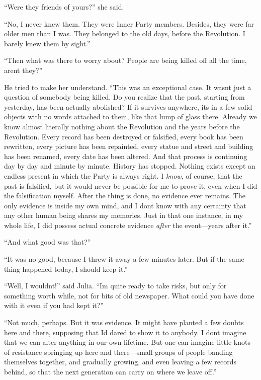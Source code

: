 ``Were they friends of yours?'' she said.

``No, I never knew them. They were Inner Party members. Besides, they
were far older men than I was. They belonged to the old days, before the
Revolution. I barely knew them by sight.''

``Then what was there to worry about? People are being killed off all the
time, aren\textquotesingle t they?''

He tried to make her understand. ``This was an exceptional case. It
wasn\textquotesingle t just a question of somebody being killed. Do you
realize that the past, starting from yesterday, has been actually
abolished? If it survives anywhere, it\textquotesingle s in a few solid
objects with no words attached to them, like that lump of glass there.
Already we know almost literally nothing about the Revolution and the
years before the Revolution. Every record has been destroyed or
falsified, every book has been rewritten, every picture has been
repainted, every statue and street and building has been renamed, every
date has been altered. And that process is continuing day by day and
minute by minute. History has stopped. Nothing exists except an endless
present in which the Party is always right. I \emph{know}, of course,
that the past is falsified, but it would never be possible for me to
prove it, even when I did the falsification myself. After the thing is
done, no evidence ever remains. The only evidence is inside my own mind,
and I don\textquotesingle t know with any certainty that any other human
being shares my memories. Just in that one instance, in my whole life, I
did possess actual concrete evidence \emph{after} the event---years
after it.''

``And what good was that?''

``It was no good, because I threw it away a few minutes later. But if the
same thing happened today, I should keep it.''

``Well, I wouldn\textquotesingle t!'' said Julia. ``I\textquotesingle m
quite ready to take risks, but only for something worth while, not for
bits of old newspaper. What could you have done with it even if you had
kept it?''

``Not much, perhaps. But it was evidence. It might have planted a few
doubts here and there, supposing that I\textquotesingle d dared to show
it to anybody. I don\textquotesingle t imagine that we can alter
anything in our own lifetime. But one can imagine little knots of
resistance springing up here and there---small groups of people banding
themselves together, and gradually growing, and even leaving a few
records behind, so that the next generation can carry on where we leave
off.''

